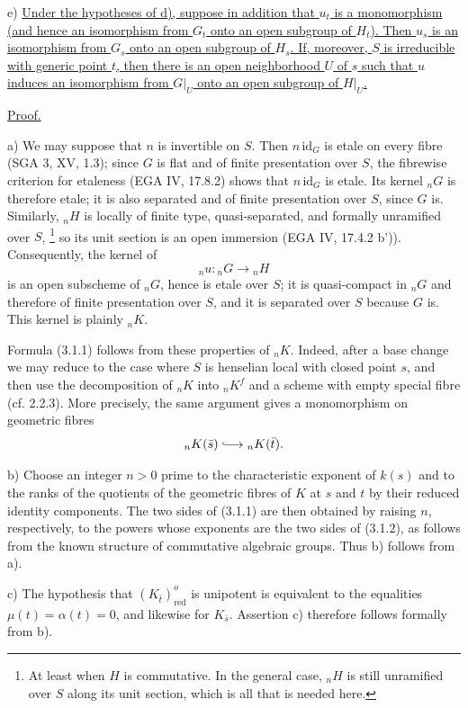 \smallskip
\noindent
e) \underline{Under the hypotheses of d), suppose in addition that $u_t$ is
a monomorphism (and hence an isomorphism from $G_t$ onto an open subgroup of
$H_t$).  Then $u_s$ is an isomorphism from $G_s$ onto an open subgroup of
$H_s$.  If, moreover, $S$ is irreducible with generic point $t$, then there
is an open neighborhood $U$ of $s$ such that $u$ induces an isomorphism from
$G|_U$ onto an open subgroup of $H|_U$.}

\medskip
\noindent
\underline{Proof.}

\smallskip
\noindent
a) We may suppose that $n$ is invertible on $S$.  Then $n\,\mathrm{id}_G$
is etale on every fibre (SGA 3, XV, 1.3); since $G$ is flat and of finite
presentation over $S$, the fibrewise criterion for etaleness (EGA IV,
17.8.2) shows that $n\,\mathrm{id}_G$ is etale.  Its kernel ${}_nG$ is
therefore etale; it is also separated and of finite presentation over $S$,
since $G$ is.  Similarly, ${}_nH$ is locally of finite type,
quasi-separated, and formally unramified over $S$,
\footnote{At least when $H$ is commutative.  In the general case, ${}_nH$
is still unramified over $S$ along its unit section, which is all that is
needed here.}
so its unit section is an open immersion (EGA IV, 17.4.2 b')).  Consequently,
the kernel of
\[
 {}_nu:{}_nG\longrightarrow {}_nH
\]
is an open subscheme of ${}_nG$, hence is etale over $S$; it is
quasi-compact in ${}_nG$ and therefore of finite presentation over $S$, and
it is separated over $S$ because $G$ is.  This kernel is plainly ${}_nK$.

Formula (3.1.1) follows from these properties of ${}_nK$.  Indeed, after a
base change we may reduce to the case where $S$ is henselian local with
closed point $s$, and then use the decomposition of ${}_nK$ into
${}_nK^f$ and a scheme with empty special fibre (cf. 2.2.3).  More precisely,
the same argument gives a monomorphism on geometric fibres
\[
 {}_nK(\bar s)\lhook\joinrel\longrightarrow {}_nK(\bar t).
\]

\smallskip
\noindent
b) Choose an integer $n>0$ prime to the characteristic exponent of $k(s)$
and to the ranks of the quotients of the geometric fibres of $K$ at $s$ and
$t$ by their reduced identity components.  The two sides of (3.1.1) are
then obtained by raising $n$, respectively, to the powers whose exponents
are the two sides of (3.1.2), as follows from the known structure of
commutative algebraic groups.  Thus b) follows from a).

\smallskip
\noindent
c) The hypothesis that $(K_{\bar t})^o_{\mathrm{red}}$ is unipotent is
equivalent to the equalities $\mu(t)=\alpha(t)=0$, and likewise for
$K_{\bar s}$.  Assertion c) therefore follows formally from b).

